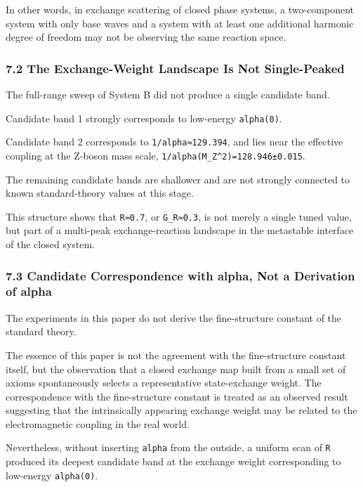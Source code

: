 \documentclass[
]{article}
\begin{document}
In other words, in exchange scattering of closed phase systems, a
two-component system with only base waves and a system with at least one
additional harmonic degree of freedom may not be observing the same
reaction space.

\subsubsection{7.2 The Exchange-Weight Landscape Is Not
Single-Peaked}\label{the-exchange-weight-landscape-is-not-single-peaked}

The full-range sweep of System B did not produce a single candidate
band.

Candidate band 1 strongly corresponds to low-energy \texttt{alpha(0)}.

Candidate band 2 corresponds to \texttt{1/alpha≈129.394}, and lies near
the effective coupling at the Z-boson mass scale,
\texttt{1/alpha(M\_Z\^{}2)=128.946±0.015}.

The remaining candidate bands are shallower and are not strongly
connected to known standard-theory values at this stage.

This structure shows that \texttt{R≈0.7}, or \texttt{G\_R≈0.3}, is not
merely a single tuned value, but part of a multi-peak exchange-reaction
landscape in the metastable interface of the closed system.

\subsubsection{7.3 Candidate Correspondence with alpha, Not a Derivation
of
alpha}\label{candidate-correspondence-with-alpha-not-a-derivation-of-alpha}

The experiments in this paper do not derive the fine-structure constant
of the standard theory.

The essence of this paper is not the agreement with the fine-structure
constant itself, but the observation that a closed exchange map built
from a small set of axioms spontaneously selects a representative
state-exchange weight. The correspondence with the fine-structure
constant is treated as an observed result suggesting that the
intrinsically appearing exchange weight may be related to the
electromagnetic coupling in the real world.

Nevertheless, without inserting \texttt{alpha} from the outside, a
uniform scan of \texttt{R} produced its deepest candidate band at the
exchange weight corresponding to low-energy \texttt{alpha(0)}.
\end{document}
